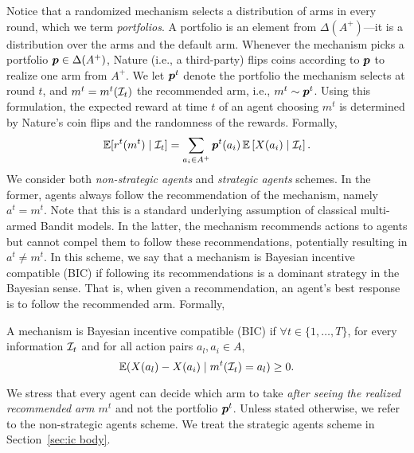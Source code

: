 Notice that a randomized mechanism selects a distribution of arms in every round, which we term \textit{portfolios}. A portfolio is an element from $\Delta(A^+)$---it is a distribution over the arms and the default arm. Whenever the mechanism picks a portfolio $\boldsymbol{ p } \in \Delta(A^+)$, Nature (i.e., a third-party) flips coins according to $\boldsymbol{ p }$ to realize one arm from $A^+$. We let $\boldsymbol{ p }^t$ denote the portfolio the mechanism selects at round $t$, and $m^t=m^t(\mathcal{I}_t)$ the recommended arm, i.e., $m^t\sim \boldsymbol{ p }^t$. Using this formulation, the expected reward at time $t$ of an agent choosing $m^t$ is determined by Nature's coin flips and the randomness of the rewards. Formally, 
\[
\operatorname{\mathbb{E}}[r^t(m^t)\mid \mathcal{I}_t]=\sum_{a_i \in A^+} \boldsymbol{ p }^t(a_i)\operatorname{\mathbb{E}}\left[X(a_i)\mid \mathcal{I}_t\right].
\]
We consider both \textit{non-strategic agents} and \textit{strategic agents} schemes. In the former, agents always follow the recommendation of the mechanism, namely $a^t=m^t$. Note that this is a standard underlying assumption of classical multi-armed Bandit models. In the latter, the mechanism recommends actions to agents but cannot compel them to follow these recommendations, potentially resulting in $a^t \neq m^t$. In this scheme, we say that a mechanism is Bayesian incentive compatible (BIC) if following its recommendations is a dominant strategy in the Bayesian sense. That is, when given a recommendation, an agent's best response is to follow the recommended arm. Formally,
\begin{definition}\label{def:ic}
A mechanism is Bayesian incentive compatible (BIC) if $\forall t \in \{1,\ldots,T\}$, for every information $\mathcal{I}_t$  and for all action pairs $a_l,a_i \in A$,
\begin{equation}\label{eq: ic const}
\operatorname{\mathbb{E}}(X(a_l)-X(a_i)\mid m^t(\mathcal{I}_t)=a_l)\geq   0.
\end{equation}
\end{definition}
We stress that every agent can decide which arm to take \textit{after seeing the realized recommended arm $m^t$} and not the portfolio $\boldsymbol{ p }^t$. Unless stated otherwise, we refer to the non-strategic agents scheme. We treat the strategic agents scheme in Section~\ref{sec:ic body}.

